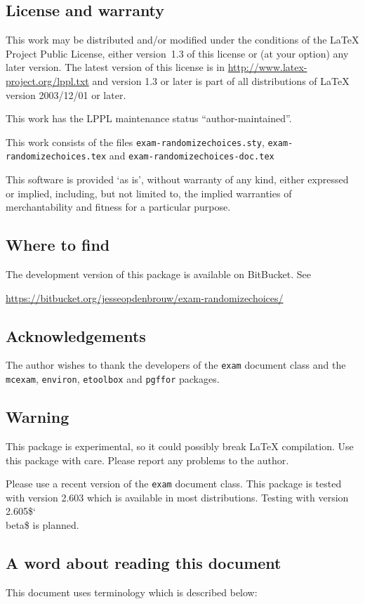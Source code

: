 \documentclass[12pt,a4paper]{exam}
\providecommand{\texorpdfstring}[2]{#1}
\newcommand{\bs}{\texorpdfstring{\char`\\}{}}
\begin{document}
\subsection{License and warranty}
This work may be distributed and/or modified under the
conditions of the \LaTeX{} Project Public
License, either version~1.3 of this
license or (at your option) any later version. The latest version
of this license is in \url{http://www.latex-project.org/lppl.txt}
and version 1.3 or later is part of all distributions of \LaTeX{}
version 2003/12/01 or later.

This work has the LPPL maintenance status ``author-maintained''.

This work consists of the files \texttt{exam-randomizechoices.sty},
\texttt{exam-randomizechoices.tex} and \texttt{exam-randomizechoices-doc.tex}

This software is provided `as is', without warranty of any kind,
either expressed or implied, including, but not limited to, the
implied warranties of merchantability and fitness for a
particular purpose.

\subsection{Where to find}
The development version of this package is available on BitBucket. See

\url{https://bitbucket.org/jesseopdenbrouw/exam-randomizechoices/}

\subsection{Acknowledgements}
The author wishes to thank the developers of the \verb|exam| document
class and the \verb|mcexam|, \verb|environ|, \verb|etoolbox| and \verb|pgffor|
packages.

\subsection{Warning}
This package is experimental, so it could possibly break \LaTeX{}
compilation. Use this package with care. Please report any problems
to the author.

Please use a recent version of the \texttt{exam} document class. This
package is tested with version 2.603 which is available in most distributions.
Testing with version 2.605\$\bs beta\$ is planned.

\subsection{A word about reading this document}
This document uses terminology which is described below:
\end{document}
